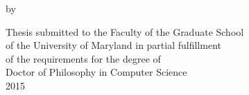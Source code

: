 \begin{titlepage}
\mbox{}\vspace{1in}
\begin{center}

    {\Large \bf \thesistitle{} \par}
    
\vspace{2in}

    {\large by} \\
    {\large \fullname{}}
    
\vspace{2in}

  \begin{singlespace}
    Thesis submitted to the Faculty of the Graduate School \\
    of the University of Maryland in partial fulfillment \\
    of the requirements for the degree of \\
    Doctor of Philosophy in Computer Science \\
    2015
	\end{singlespace}
\end{center}
\end{titlepage}
